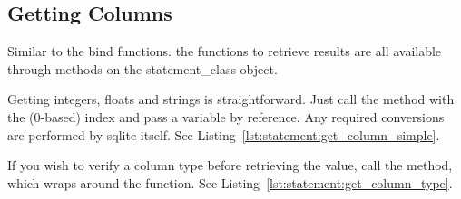 \subsection{Getting Columns}
\label{section:statement:get}

Similar to the bind functions. the  functions to retrieve results are all available through methods on the \gls{statement_class} object.

Getting integers, floats and strings is straightforward. Just call the  method with the (0-based) index and pass a variable by reference. Any required conversions are performed by \gls{sqlite} itself. See Listing~\ref{lst:statement:get_column_simple}.



If you wish to verify a column type before retrieving the value, call the  method, which wraps around the  function. See Listing~\ref{lst:statement:get_column_type}.



